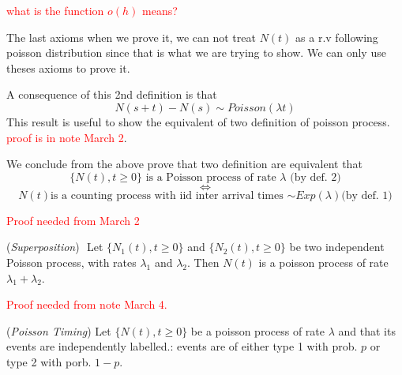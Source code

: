 \documentclass[10.5pt]{article}
\newenvironment{changemargin}[2]{%
  \begin{list}{}{%
    \setlength{\topsep}{0pt}%
    \setlength{\leftmargin}{#1}%
    \setlength{\rightmargin}{#2}%
    \setlength{\listparindent}{\parindent}%
    \setlength{\itemindent}{\parindent}%
    \setlength{\parsep}{\parskip}%
  }%
  \item[]}{\end{list}}
\begin{document}
\begin{changemargin}{-0.125in}{0in}
\begin{enumerate}
\begin{enumerate}
                   \textcolor{red}{what is the function $o(h)$ means?}
                   
                   \smallskip
                   
                   The last axioms when we prove it, we can not treat $N(t)$ as a r.v following poisson distribution since that is what we are trying to show. We can only use theses axioms to prove it. 
                   
                   \begin{remark}
                   	A consequence of this 2nd definition is that 
                   	\[
                   	N(s+t) - N(s) \sim Poisson (\lambda t)
                   	\]
                   	This result is useful to show the equivalent of two definition of poisson process. \textcolor{red}{proof is in note March 2}.
                   \end{remark}
                   
                   \begin{theorem}
                   	We conclude from the above prove that two definition are equivalent that 
                   	\[
                   	\{N(t), t \geq 0\} \text{ is a Poisson process of rate $\lambda$ (by def. 2)}
                   	\]
                   	\[
                   	\Longleftrightarrow
                   	\]
                   	\[
                   	N(t) \text{is a counting process with iid inter arrival times $\sim Exp(\lambda) $(by def. 1)}
                   	\]
                   \end{theorem}
                   \textcolor{red}{Proof needed from March 2}
                   
                   \medskip
                   
                   \begin{theorem}
                   	(\textit{Superposition})\,\, Let $\{N_1(t), t \geq 0\}$ and $\{N_2(t), t \geq 0\}$ be two independent Poisson process, with rates $\lambda_1$ and $\lambda_2$. Then $N(t)$ is a poisson process of rate $\lambda_1 + \lambda_2$.
                   \end{theorem}   
                   
                   \textcolor{red}{Proof needed from note March 4.}                
                   \begin{proposition}
                   	(\textit{Poisson Timing}) Let $\{N(t), t \geq 0\}$ be a poisson process of rate $\lambda$ and that its events are independently labelled.: events are of either type 1 with prob. $p$ or type 2 with porb. $1 - p$. 
                   	

\end{proposition}
\end{enumerate}
\end{enumerate}
\end{changemargin}
\end{document}
